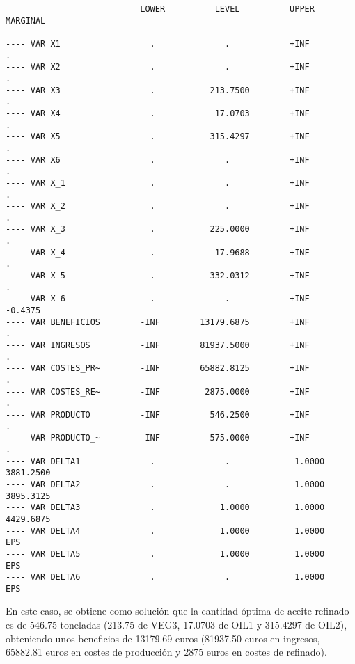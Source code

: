 \documentclass[12pt,a4paper,twoside,openright,titlepage,final]{article}
\begin{document}
\begin{verbatim}
                           LOWER          LEVEL          UPPER         MARGINAL

---- VAR X1                  .              .            +INF             .          
---- VAR X2                  .              .            +INF             .          
---- VAR X3                  .           213.7500        +INF             .          
---- VAR X4                  .            17.0703        +INF             .          
---- VAR X5                  .           315.4297        +INF             .          
---- VAR X6                  .              .            +INF             .          
---- VAR X_1                 .              .            +INF             .          
---- VAR X_2                 .              .            +INF             .          
---- VAR X_3                 .           225.0000        +INF             .          
---- VAR X_4                 .            17.9688        +INF             .          
---- VAR X_5                 .           332.0312        +INF             .          
---- VAR X_6                 .              .            +INF           -0.4375      
---- VAR BENEFICIOS        -INF        13179.6875        +INF             .          
---- VAR INGRESOS          -INF        81937.5000        +INF             .          
---- VAR COSTES_PR~        -INF        65882.8125        +INF             .          
---- VAR COSTES_RE~        -INF         2875.0000        +INF             .          
---- VAR PRODUCTO          -INF          546.2500        +INF             .          
---- VAR PRODUCTO_~        -INF          575.0000        +INF             .          
---- VAR DELTA1              .              .             1.0000      3881.2500      
---- VAR DELTA2              .              .             1.0000      3895.3125      
---- VAR DELTA3              .             1.0000         1.0000      4429.6875      
---- VAR DELTA4              .             1.0000         1.0000         EPS         
---- VAR DELTA5              .             1.0000         1.0000         EPS         
---- VAR DELTA6              .              .             1.0000         EPS         
\end{verbatim}

En este caso, se obtiene como solución que la cantidad óptima de aceite refinado es de 546.75 toneladas (213.75 de VEG3, 17.0703 de OIL1 y 315.4297 de OIL2), obteniendo unos beneficios de 13179.69 euros (81937.50 euros en ingresos, 65882.81 euros en costes de producción y 2875 euros en costes de refinado).\\
\end{document}
